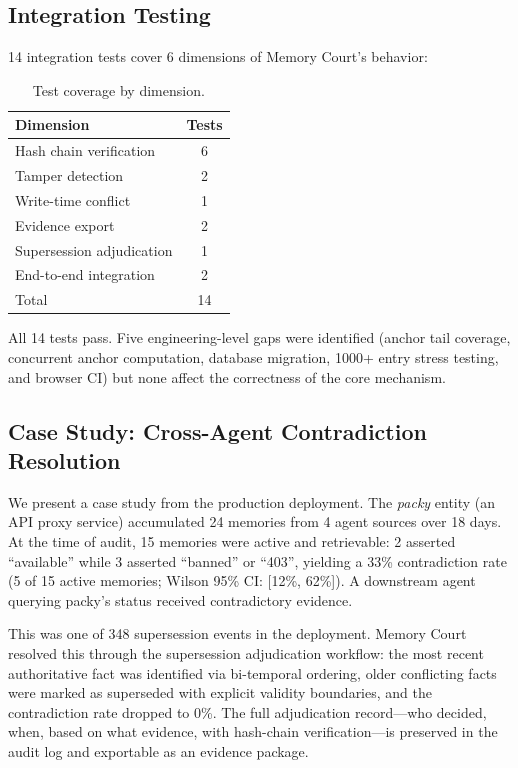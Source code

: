 \documentclass{article}
\begin{document}
\subsection{Integration Testing}

14 integration tests cover 6 dimensions of Memory Court's behavior:

\begin{table}[h]
\centering
\caption{Test coverage by dimension.}
\label{tab:tests}
\begin{tabular}{lc}
\toprule
Dimension & Tests \\
\midrule
Hash chain verification & 6 \\
Tamper detection & 2 \\
Write-time conflict & 1 \\
Evidence export & 2 \\
Supersession adjudication & 1 \\
End-to-end integration & 2 \\
\midrule
Total & 14 \\
\bottomrule
\end{tabular}
\end{table}

All 14 tests pass. Five engineering-level gaps were identified (anchor tail coverage, concurrent anchor computation, database migration, 1000+ entry stress testing, and browser CI) but none affect the correctness of the core mechanism.

\subsection{Case Study: Cross-Agent Contradiction Resolution}

We present a case study from the production deployment. The \emph{packy} entity (an API proxy service) accumulated 24 memories from 4 agent sources over 18 days. At the time of audit, 15 memories were active and retrievable: 2 asserted ``available'' while 3 asserted ``banned'' or ``403'', yielding a 33\% contradiction rate (5 of 15 active memories; Wilson 95\% CI: [12\%, 62\%]). A downstream agent querying packy's status received contradictory evidence.

This was one of 348 supersession events in the deployment. Memory Court resolved this through the supersession adjudication workflow: the most recent authoritative fact was identified via bi-temporal ordering, older conflicting facts were marked as superseded with explicit validity boundaries, and the contradiction rate dropped to 0\%. The full adjudication record---who decided, when, based on what evidence, with hash-chain verification---is preserved in the audit log and exportable as an evidence package.
\end{document}
